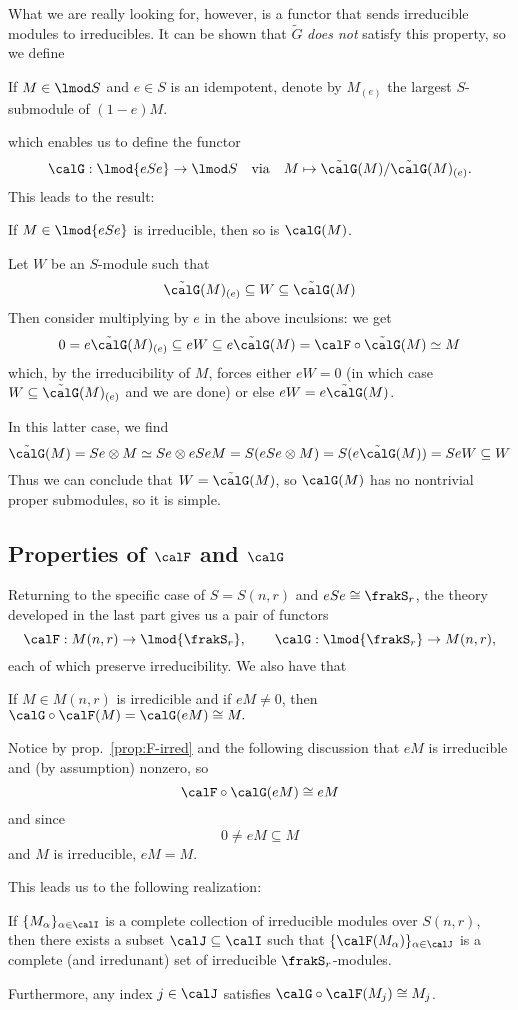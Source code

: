 \documentclass[12pt]{article}
\begin{document}
What we are really looking for, however, is a functor that sends irreducible modules to irreducibles. It can be shown that $\tilde G$ 
\textit{does not} satisfy this property, so we define 
\begin{defn}
	If $M\in\lmod S$ and $e\in S$ is an idempotent, denote by $M_{(e)}$ the largest $S$-submodule of $(1-e)M$.
\end{defn}
\noindent which enables us to define the functor 
\[\calG:\lmod{eSe}\to \lmod S\quad\text{via}\quad M\mapsto \tilde\calG(M)/\tilde\calG(M)_{(e)}.\]
This leads to the result:
\begin{prop}
	If $M\in \lmod{eSe}$ is irreducible, then so is $\calG(M)$.
\end{prop}
\begin{prf}
	Let $W$ be an $S$-module such that 
	\[\tilde\calG(M)_{(e)}\subseteq W\subseteq \tilde\calG(M)\]
	Then consider multiplying by $e$ in the above inculsions:
	we get
	\[0=e\tilde\calG(M)_{(e)}\subseteq eW\subseteq e\tilde \calG(M)=\calF\circ\tilde\calG(M)\simeq M\]
	which, by the irreducibility of $M$, forces either $eW=0$ (in which case $W\subseteq\tilde\calG(M)_{(e)}$ and we are done)
	or else $eW=e\tilde\calG(M)$.

	In this latter case, we find 
	\[\tilde\calG(M)= Se\otimes M\simeq Se\otimes eSeM=S(eSe\otimes M)=S(e\tilde\calG(M))=SeW\subseteq W\]
	Thus we can conclude that $W=\tilde\calG(M)$, so $\calG(M)$ has no nontrivial proper submodules, so it is simple.
\end{prf}

\subsection{Properties of \texorpdfstring{$\calF$ and $\calG$}{F and G}}
Returning to the specific case of $S=S(n,r)$ and $eSe\cong\frakS_r$, the theory developed in the last part
gives us a pair of functors
\[\calF:M(n,r)\to \lmod{\frakS_r},\qquad \calG:\lmod{\frakS_r}\to M(n,r),\]
each of which preserve irreducibility. We also have that
\begin{prop}
	If $M\in M(n,r)$ is irredicible and if $eM\ne 0$, then $\calG\circ\calF(M)=\calG(eM)\cong M.$
\end{prop}
\begin{prf}
	Notice by prop.~\ref{prop:F-irred} and the following discussion that $eM$ is irreducible and (by assumption) nonzero, so
	\[\calF\circ\calG(eM)\cong eM\]
	and since 
	\[0\ne eM\subseteq M\]
	and $M$ is irreducible, $eM=M$.
\end{prf}
This leads us to the following realization:
\begin{cor}
	If $\{M_\alpha\}_{\alpha\in\calI}$ is a complete collection of irreducible modules over $S(n,r)$,
	then there exists a subset $\calJ\subseteq\calI$ such that $\{\calF(M_\alpha)\}_{\alpha\in\calJ}$
	is a complete (and irredunant) set of irreducible $\frakS_r$-modules.

	Furthermore, any index $j\in\calJ$ satisfies $\calG\circ\calF(M_j)\cong M_j$.
\end{cor}
\end{document}
